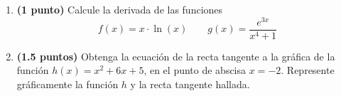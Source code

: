 
\begin{enumerate}[label=\alph*)]
\item \textbf{(1 punto)} Calcule la derivada de las funciones
\[
f(x)=x\cdot\ln(x)\qquad g(x)=\frac{e^{3x}}{x^4+1}
\]
\item \textbf{(1.5 puntos)} Obtenga la ecuación de la recta tangente a la gráfica de la función $h(x)=x^2+6x+5$, en el punto de abscisa $x=-2$. Represente gráficamente la función $h$ y la recta tangente hallada.
\end{enumerate}
